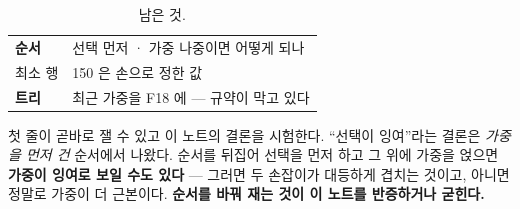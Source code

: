 \documentclass[10pt]{article}
\begin{document}
\begin{table}[t]
\centering\tsize
\caption{남은 것.}
\begin{tabular}{ll}
\toprule
\textbf{순서} & 선택 먼저 · 가중 나중이면 어떻게 되나 \\
최소 행 & 150 은 손으로 정한 값 \\
\textbf{트리} & 최근 가중을 F18 에 --- 규약이 막고 있다 \\
\bottomrule
\end{tabular}
\end{table}

첫 줄이 곧바로 잴 수 있고 이 노트의 결론을 시험한다. ``선택이 잉여''라는
결론은 \emph{가중을 먼저 건} 순서에서 나왔다. 순서를 뒤집어 선택을 먼저
하고 그 위에 가중을 얹으면 \textbf{가중이 잉여로 보일 수도 있다} --- 그러면
두 손잡이가 대등하게 겹치는 것이고, 아니면 정말로 가중이 더 근본이다.
\textbf{순서를 바꿔 재는 것이 이 노트를 반증하거나 굳힌다.}
\end{document}

